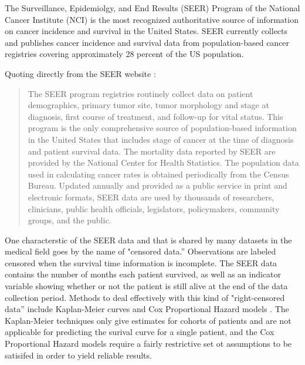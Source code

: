 \documentclass[a4paper,11pt]{article}
\begin{document}
The Surveillance, Epidemiolgy, and End Results (SEER) Program of the National Cancer Institute (NCI) is the most recognized authoritative source of information on cancer incidence and survival in the United States. SEER currently collects and publishes cancer incidence and survival data from population-based cancer registries covering approximately 28 percent of the US population.

Quoting directly from the SEER
website \citep{seerwebsite}:

\begin{quote}
The SEER program registries routinely collect data on patient demographics, primary tumor site, tumor morphology and stage at diagnosis, first course of treatment, and follow-up for vital status. This program is the only comprehensive source of population-based information in the United States that includes stage of cancer at the time of diagnosis and patient survival data. The mortality data reported by SEER are provided by the National Center for Health Statistics. The population data used in calculating cancer rates is obtained periodically from the Census Bureau. Updated annually and provided as a public service in print and electronic formats, SEER data are used by thousands of researchers, clinicians, public health officials, legislators, policymakers, community groups, and the public.
\end{quote}





One characterstic of the SEER data and that is shared by many datasets in the medical field 
goes by the name of "censored data.''
Observations are labeled censored when the survival time information is incomplete.
 The SEER data contains the number of months each patient survived, as well as an indicator variable showing whether or not the patient is still alive at the end of the data collection period.
Methods to deal effectively with this kind of "right-censored data'' include Kaplan-Meier curves
and Cox Proportional Hazard models \cite{cam}. The Kaplan-Meier techniques only give estimates for cohorts of patients and are not applicable for predicting the surival curve for a single patient, and the Cox Proportional Hazard models require a fairly restrictive set ot assumptions to be satisifed in order to yield reliable results. 
\end{document}

